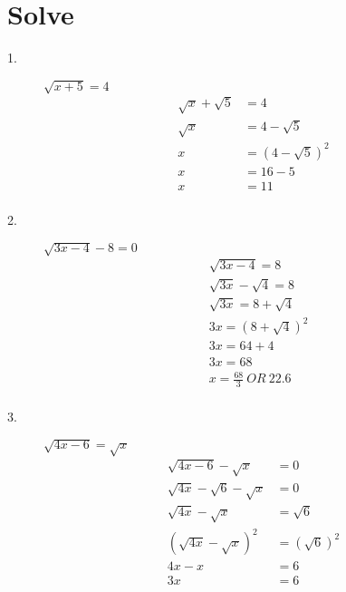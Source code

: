 \documentclass{article}
\begin{document}
\section*{Solve}
\begin{description}
    \item[1. ]  $\sqrt{x+5} = 4$
        $$
            \begin{aligned}
                \sqrt{x} + \sqrt{5} & = 4                \\
                \sqrt{x}            & = 4 - \sqrt{5}     \\
                x                   & = (4 - \sqrt{5})^2 \\
                x                   & = 16 - 5           \\
                x                   & = 11               \\
            \end{aligned}
        $$
    \item[2. ]  $\sqrt{3x-4} - 8 = 0$
        $$
            \begin{aligned}
                 & \sqrt{3x-4}  = 8                 \\
                 & \sqrt{3x} - \sqrt{4}  = 8        \\
                 & \sqrt{3x}   = 8 + \sqrt{4}       \\
                 & 3x   = (8 + \sqrt{4})^2          \\
                 & 3x   = 64 + 4                    \\
                 & 3x   = 68                        \\
                 & x   = \frac{68}{3}   \ OR \ 22.6 \\
            \end{aligned}
        $$
    \item[3. ]  $\sqrt{4x-6} = \sqrt{x}$
        $$
            \begin{aligned}
                \sqrt{4x-6} - \sqrt{x}          & =0            \\
                \sqrt{4x} - \sqrt{6} - \sqrt{x} & =0            \\
                \sqrt{4x}  - \sqrt{x}           & =\sqrt{6}     \\
                (\sqrt{4x}  - \sqrt{x})^2       & =(\sqrt{6})^2 \\
                4x  - x                         & =6            \\
                3x                              & =6            \\

\end{aligned}$$
\end{description}
\end{document}
